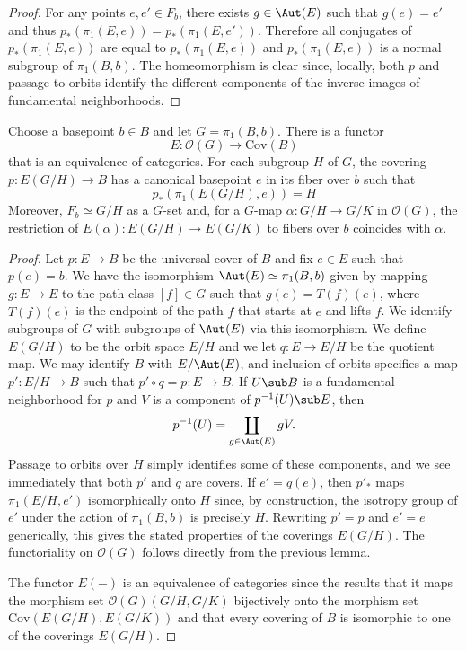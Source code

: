 \begin{proof}
For any points $e,e'\in F_b$, there exists $g\in\Aut(E)$ such that $g(e)=e'$ and thus $p_*(\pi_1(E,e))=p_*(\pi_1(E,e′))$. Therefore all conjugates of $p_*(\pi_1(E,e))$ are equal to $p_*(\pi_1(E, e))$ and $p_*(\pi_1(E,e))$ is a normal subgroup of $\pi_1(B,b)$. The homeomorphism is clear since, locally, both $p$ and passage to orbits identify the different components of the inverse images of fundamental neighborhoods.
\end{proof}
\begin{theorem}
Choose a basepoint $b\in B$ and let $G=\pi_1(B,b)$. There is a functor
\[E:\mathcal{O}(G)\to\mathrm{Cov}(B)\]
that is an equivalence of categories. For each subgroup $H$ of $G$, the covering $p:E(G/H)\to B$ has a canonical basepoint $e$ in its fiber over $b$ such that
\[p_*(\pi_1(E(G/H),e))=H\]
Moreover, $F_b\simeq G/H$ as a $G$-set and, for a $G$-map $\alpha:G/H\to G/K$ in $\mathcal{O}(G)$, the restriction of $E(\alpha):E(G/H)\to E(G/K)$ to fibers over $b$ coincides with $\alpha$.
\end{theorem}
\begin{proof}
Let $p:E\to B$ be the universal cover of $B$ and fix $e\in E$ such that $p(e)=b$. We have the isomorphism $\Aut(E)\simeq\pi_1(B,b)$ given by mapping
$g:E\to E$ to the path class $[f]\in G$ such that $g(e)=T(f)(e)$, where $T(f)(e)$ is the endpoint of the path $\widetilde{f}$ that starts at $e$ and lifts $f$. We identify subgroups of $G$ with subgroups of $\Aut(E)$ via this isomorphism. We define $E(G/H)$ to be the orbit space $E/H$ and we let $q:E\to E/H$ be the quotient map. We may identify $B$ with $E/\Aut(E)$, and inclusion of orbits specifies a map $p':E/H\to B$ such that $p'\circ q=p:E\to B$. If $U\sub B$ is a fundamental neighborhood for $p$ and $V$ is a component of $p^{-1}(U)\sub E$, then
\[p^{-1}(U)=\coprod_{g\in\Aut(E)}gV.\]
Passage to orbits over $H$ simply identifies some of these components, and we see immediately that both $p'$ and $q$ are covers. If $e'=q(e)$, then $p'_*$ maps $\pi_1(E/H,e')$ isomorphically onto $H$ since, by construction, the isotropy group of $e'$ under the action of $\pi_1(B,b)$ is precisely $H$. Rewriting $p'=p$ and $e'=e$ generically, this gives the stated properties of the coverings $E(G/H)$. The functoriality on $\mathcal{O}(G)$ follows directly from the previous lemma.\par
The functor $E(-)$ is an equivalence of categories since the results that it maps the morphism set $\mathcal{O}(G)(G/H,G/K)$ bijectively onto the morphism set $\mathrm{Cov}(E(G/H),E(G/K))$ and that every covering of $B$ is isomorphic to one of the coverings $E(G/H)$.
\end{proof}
